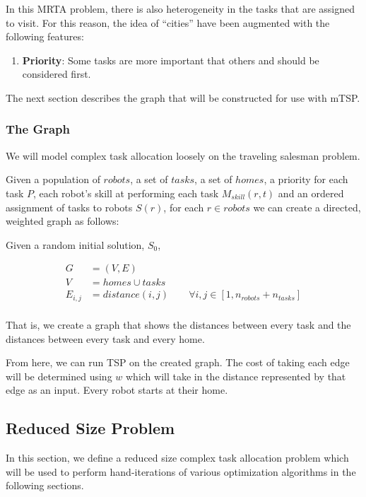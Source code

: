 \documentclass[a4paper]{article}
\begin{document}
In this MRTA problem, there is also heterogeneity in the tasks that are assigned to visit. For this reason, the idea of ``cities'' have been augmented with the following features:

\begin{enumerate}
\item \textbf{Priority}: Some tasks are more important that others and should be considered first.
\end{enumerate}

The next section describes the graph that will be constructed for use with mTSP.

\subsubsection{The Graph}
We will model complex task allocation loosely on the traveling salesman problem.

Given a population of $\mathit{robots}$, a set of $\mathit{tasks}$, a set of $\mathit{homes}$, a priority for each task $P$, each robot's skill at performing each task $M_{skill}(r,t)$ and an ordered assignment of tasks to robots $S(r)$, for each $r \in \mathit{robots}$
we can create a directed, weighted graph as follows:

Given a random initial solution, $S_0$,

\begin{align*}
	G &= (V, E) \\
	V &= \mathit{homes} \cup \mathit{tasks} \\
	E_{i, j} &= distance(i,j) \qquad \forall i,j \in [1, n_{robots}+n_{tasks}] \\
\end{align*}
%

That is, we create a graph that shows the distances between every task and the distances between every task and every home.

From here, we can run TSP on the created graph. The cost of taking each edge will be determined using $w$ which will take in the distance represented by that edge as an input. Every robot starts at their home.

\subsection{Reduced Size Problem}

In this section, we define a reduced size complex task allocation problem which
will be used to perform hand-iterations of various optimization algorithms in
the following sections.
\end{document}
